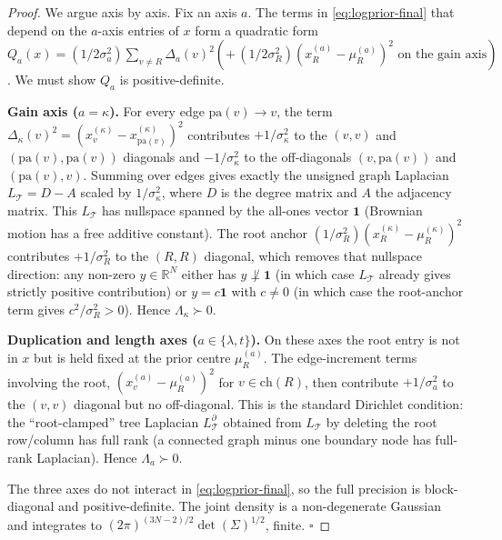 \documentclass[11pt]{article}
\newcommand{\R}{\mathbb{R}}
\newcommand{\Tree}{\mathcal{T}}
\newcommand{\pa}{\mathrm{pa}}
\newcommand{\ch}{\mathrm{ch}}
\newcommand{\troot}{R}
\newcommand{\rate}{\kappa}             %
\newcommand{\dup}{\lambda}             %
\newcommand{\loss}{\mu}                %
\newcommand{\edgelen}{t}               %
\theoremstyle{definition}
\begin{document}
\begin{proof}
We argue axis by axis. Fix an axis $a$. The terms in
\eqref{eq:logprior-final} that depend on the $a$-axis entries of $x$
form a quadratic form
\(
Q_a(x) = (1/2\sigma_a^2)\sum_{v\neq\troot}\Delta_a(v)^2
       (+\, (1/2\sigma_\troot^2)(x^{(a)}_\troot - \loss^{(a)}_\troot)^2
       \text{ on the gain axis})\).
We must show $Q_a$ is positive-definite.

\textbf{Gain axis ($a=\rate$).} For every edge $\pa(v)\to v$, the
term $\Delta_\rate(v)^2 = (x^{(\rate)}_v - x^{(\rate)}_{\pa(v)})^2$
contributes $+1/\sigma_\rate^2$ to the $(v,v)$ and
$(\pa(v),\pa(v))$ diagonals and $-1/\sigma_\rate^2$ to the
off-diagonals $(v,\pa(v))$ and $(\pa(v), v)$.  Summing over edges
gives exactly the unsigned graph Laplacian
$L_\Tree = D - A$ scaled by $1/\sigma_\rate^2$, where $D$ is the
degree matrix and $A$ the adjacency matrix.  This $L_\Tree$ has
nullspace spanned by the all-ones vector $\mathbf{1}$ (Brownian
motion has a free additive constant).  The root anchor
$(1/\sigma_\troot^2)(x^{(\rate)}_\troot - \loss^{(\rate)}_\troot)^2$
contributes $+1/\sigma_\troot^2$ to the $(\troot,\troot)$ diagonal,
which removes that nullspace direction: any non-zero
$y \in \R^N$ either has $y \not\perp \mathbf{1}$ (in which case
$L_\Tree$ already gives strictly positive contribution) or
$y = c\mathbf{1}$ with $c\neq 0$ (in which case the root-anchor term
gives $c^2/\sigma_\troot^2 > 0$). Hence $\Lambda_\rate \succ 0$.

\textbf{Duplication and length axes ($a\in\{\dup, \edgelen\}$).}
On these axes the root entry is not in $x$ but is held fixed at the
prior centre $\loss^{(a)}_\troot$. The edge-increment terms involving
the root,
$(x^{(a)}_{v} - \loss^{(a)}_\troot)^2$ for $v \in \ch(\troot)$, then
contribute $+1/\sigma_a^2$ to the $(v,v)$ diagonal but no
off-diagonal. This is the standard Dirichlet condition: the
``root-clamped'' tree Laplacian $L^\partial_\Tree$ obtained from
$L_\Tree$ by deleting the root row/column has full rank (a connected
graph minus one boundary node has full-rank Laplacian).  Hence
$\Lambda_a \succ 0$.

The three axes do not interact in \eqref{eq:logprior-final}, so the
full precision is block-diagonal and positive-definite. The joint
density is a non-degenerate Gaussian and integrates to
$(2\pi)^{(3N-2)/2}\det(\Sigma)^{1/2}$, finite. $\square$
\end{proof}
\end{document}
